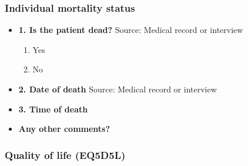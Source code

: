 \documentclass[
]{scrartcl}
\providecommand{\tightlist}{%
  \setlength{\itemsep}{0pt}\setlength{\parskip}{0pt}}\usepackage{longtable,booktabs,array}
\begin{document}
\hypertarget{individual-mortality-status}{%
\subsubsection{Individual mortality
status}\label{individual-mortality-status}}

\begin{itemize}
\item
  \textbf{1. Is the patient dead?} Source: Medical record or interview

  \begin{enumerate}
  \def\labelenumi{\arabic{enumi}.}
  \tightlist
  \item
    Yes
  \item
    No
  \end{enumerate}
\item
  \textbf{2. Date of death} Source: Medical record or interview
\item
  \textbf{3. Time of death}
\item
  \textbf{Any other comments?}
\end{itemize}

\hypertarget{quality-of-life-eq5d5l}{%
\subsubsection{Quality of life (EQ5D5L)}\label{quality-of-life-eq5d5l}}
\end{document}
